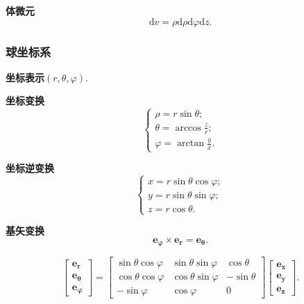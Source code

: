 \textbf{体微元}
\begin{equation}
    \mathrm{d}v=\rho\mathrm{d}\rho\mathrm{d}\varphi\mathrm{d}z.
\end{equation}

\subsubsection{球坐标系}
\textbf{坐标表示}\quad $(r, \theta, \varphi)$.

\textbf{坐标变换}
\begin{equation}
    \begin{cases}
        \rho=r\sin\theta;          \\
        \theta=\arccos\frac{z}{r}; \\
        \varphi=\arctan\frac{y}{x}.
    \end{cases}
\end{equation}

\textbf{坐标逆变换}
\begin{equation}
    \begin{cases}
        x=r\sin\theta\cos\varphi; \\
        y=r\sin\theta\sin\varphi; \\
        z=r\cos\theta.
    \end{cases}
\end{equation}

\textbf{基矢变换}
\begin{equation}
    \bm{e_\varphi}\times\bm{e_r}=\bm{e_\theta}.
\end{equation}

\begin{equation}
    \begin{bmatrix}
        \bm{e_r}      \\
        \bm{e_\theta} \\
        \bm{e_\varphi}
    \end{bmatrix}=\begin{bmatrix}
        \sin\theta\cos\varphi & \sin\theta\sin\varphi & \cos\theta  \\
        \cos\theta\cos\varphi & \cos\theta\sin\varphi & -\sin\theta \\
        -\sin\varphi          & \cos\varphi           & 0
    \end{bmatrix}\begin{bmatrix}
        \bm{e_x} \\
        \bm{e_y} \\
        \bm{e_z}
    \end{bmatrix}.
\end{equation}

